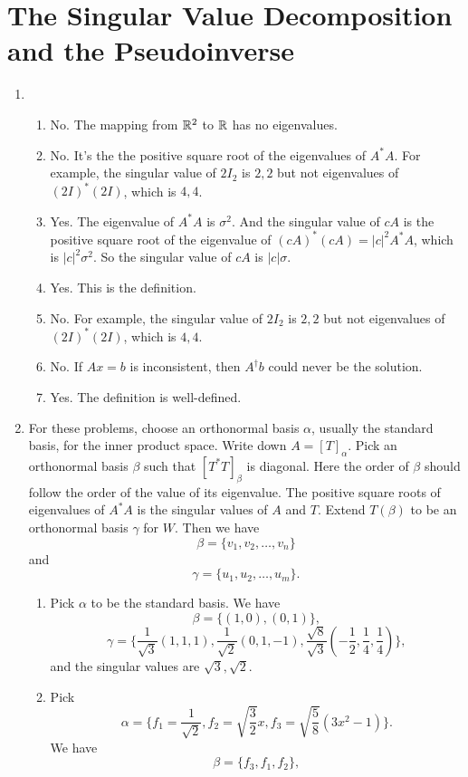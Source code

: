 \section{The Singular Value Decomposition and the Pseudoinverse}
\begin{enumerate}
\item \begin{enumerate}
\item No. The mapping from $\mathbb{R}^2$ to $\mathbb{R}$ has no eigenvalues.
\item No. It's the the positive square root of the eigenvalues of $A^*A$. For example, the singular value of $2I_2$ is $2,2$ but not eigenvalues of $(2I)^*(2I)$, which is $4,4$.
\item Yes. The eigenvalue of $A^*A$ is $\sigma^2$. And the singular value of $cA$ is the positive square root of the eigenvalue of $(cA)^*(cA)=|c|^2A^*A$, which is $|c|^2\sigma ^2$. So the singular value of $cA$ is $|c|\sigma $.
\item Yes. This is the definition.
\item No. For example, the singular value of $2I_2$ is $2,2$ but not eigenvalues of $(2I)^*(2I)$, which is $4,4$.
\item No. If $Ax=b$ is inconsistent, then $A^{\dagger }b$ could never be the solution.
\item Yes. The definition is well-defined.
\end{enumerate}
\item For these problems, choose an orthonormal basis $\alpha $, usually the standard basis, for the inner product space. Write down $A=[T]_{\alpha}$. Pick an orthonormal basis $\beta $ such that $[T^*T]_{\beta}$ is diagonal. Here the order of $\beta$ should follow the order of the value of its eigenvalue. The positive square roots of eigenvalues of $A^*A$ is the singular values of $A$ and $T$.  Extend $T(\beta )$ to be an orthonormal basis $\gamma$ for $W$. Then we have 
\[\beta =\{v_1,v_2,\ldots ,v_n\}\]
and 
\[\gamma =\{u_1,u_2,\ldots ,u_m\}.\]
\begin{enumerate}
\item Pick $\alpha $ to be the standard basis. We have 
\[\beta =\{(1,0),(0,1)\},\]
\[\gamma =\{\frac{1}{\sqrt{3}}(1,1,1),\frac{1}{\sqrt{2}}(0,1,-1),\frac{\sqrt{8}}{\sqrt{3}}(-\frac{1}{2},\frac{1}{4},\frac{1}{4})\},\]
and the singular values are $\sqrt{3},\sqrt{2}$.
\item Pick 
\[\alpha =\{f_1=\frac{1}{\sqrt{2}},f_2=\sqrt{\frac{3}{2}}x,f_3=\sqrt{\frac{5}{8}}(3x^2-1)\}.\]
We have 
\[\beta =\{f_3,f_1,f_2\},\]

\end{enumerate}
\end{enumerate}
